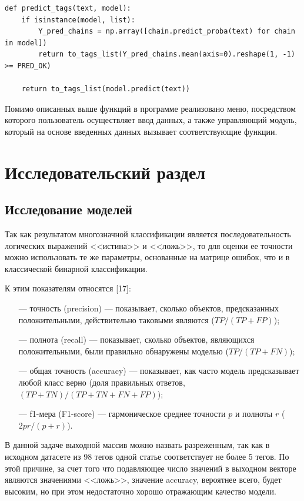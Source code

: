 \documentclass[a4paper, 12pt]{article}
\begin{document}
\begin{large}
\begin{lstlisting}[caption={Применение моделей}]
def predict_tags(text, model):
    if isinstance(model, list):
        Y_pred_chains = np.array([chain.predict_proba(text) for chain in model])
        return to_tags_list(Y_pred_chains.mean(axis=0).reshape(1, -1) >= PRED_OK)
    
    return to_tags_list(model.predict(text))
\end{lstlisting}

Помимо описанных выше функций в программе реализовано меню, посредством которого пользователь осуществляет ввод данных, а также управляющий модуль, который на основе введенных данных вызывает соответствующие функции.

\newpage

\section{Исследовательский раздел}
\subsection{Исследование моделей}
Так как результатом многозначной классификации является последовательность логических выражений <<истина>> и <<ложь>>, то для оценки ее точности можно использовать те же параметры, основанные на матрице ошибок, что и в классической бинарной классификации.

К этим показателям относятся [17]:
\begin{itemize}
    \item[---] точность (precision) --- показывает, сколько объектов, предсказанных положительными, действительно таковыми являются ($TP / (TP + FP)$);
    \item[---] полнота (recall) --- показывает, сколько объектов, являющихся положительными, были правильно обнаружены моделью ($TP / (TP + FN)$);
    \item[---] общая точность (accuracy) --- показывает, как часто модель предсказывает любой класс верно (доля правильных ответов, $(TP + TN) / (TP + TN + FN + FP)$);
    \item[---] f1-мера (F1-score) --- гармоническое среднее точности $p$ и полноты $r$ ($2pr/(p + r)$).
\end{itemize}

В данной задаче выходной массив можно назвать разреженным, так как в исходном датасете из 98 тегов одной статье соответствует не более 5 тегов. 
По этой причине, за счет того что подавляющее число значений в выходном векторе являются значениями <<ложь>>, значение accuracy, вероятнее всего, будет высоким, но при этом недостаточно хорошо отражающим качество модели.


\end{large}
\end{document}
